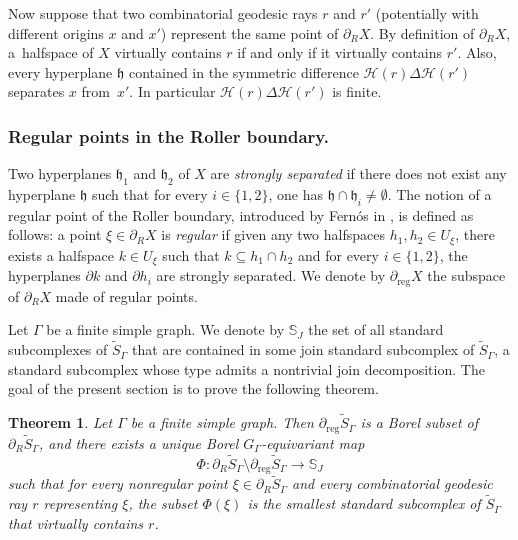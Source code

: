 \documentclass[JEP,XML,SOM,Unicode,NoFloatCountersInSection,published]{cedram}
\let\mathcal\mathscr
\theoremstyle{plain}
\newtheorem{theo}{Theorem}[section]
\theoremstyle{definition}
\newcommand{\calh}{\mathcal{H}}
\newcommand{\reg}{\mathrm{reg}}
\begin{document}
Now suppose that two combinatorial geodesic rays $r$ and $r'$ (potentially with different origins $x$ and $x'$) represent the same point of $\partial_R X$. By definition of $\partial_R X$, a~halfspace of $X$ virtually contains $r$ if and only if it virtually contains $r'$. Also, \hbox{every} hyperplane $\mathfrak{h}$ contained in the symmetric difference $\calh(r)\Delta\calh(r')$ separates $x$ from~$x'$. In particular $\calh(r)\Delta\calh(r')$ is finite.

\subsubsection*{Regular points in the Roller boundary.} Two hyperplanes $\mathfrak{h}_1$ and $\mathfrak{h}_2$ of $X$ are \emph{strongly separated} \cite[Def.\,2.1]{behrstock2012divergence} if there does not exist any hyperplane $\mathfrak{h}$ such that for every $i\in\{1,2\}$, one has $\mathfrak{h}\cap\mathfrak{h}_i\neq\emptyset$. The notion of a regular point of the Roller boundary, introduced by Fernós in \cite[Def.\,7.3]{Fer}, is defined as follows: a point $\xi\in\partial_R X$ is \emph{regular} if given any two halfspaces $h_1,h_2\in U_\xi$, there exists a halfspace $k\in U_\xi$ such that $k\subseteq h_1\cap h_2$ and for every $i\in\{1,2\}$, the hyperplanes $\partial k$ and $\partial h_i$ are strongly separated. We denote by $\partial_{\reg}X$ the subspace of $\partial_R X$ made of regular points.


Let $\Gamma$ be a finite simple graph. We denote by $\mathbb{S}_J$ the set of all standard subcomplexes of $\widetilde{S}_\Gamma$ that are contained in some join standard subcomplex of $\widetilde{S}_\Gamma$, \ie a standard subcomplex whose type admits a nontrivial join decomposition. The goal of the present section is to prove the following theorem.

\begin{theo}\label{theo:roller}
Let $\Gamma$ be a finite simple graph. Then $\partial_\reg\widetilde{S}_\Gamma$ is a Borel subset of $\partial_R\widetilde{S}_\Gamma$, and there exists a unique Borel $G_\Gamma$-equivariant map
\[
\Phi:\partial_R\widetilde{S}_\Gamma\setminus\partial_\reg\widetilde{S}_\Gamma\to\mathbb{S}_J
\]
such that for every nonregular point $\xi\in\partial_R\widetilde{S}_\Gamma$ and every combinatorial geodesic ray $r$ representing $\xi$, the subset $\Phi(\xi)$ is the smallest standard subcomplex of $\widetilde{S}_\Gamma$ that virtually contains $r$.
\end{theo}
\end{document}
